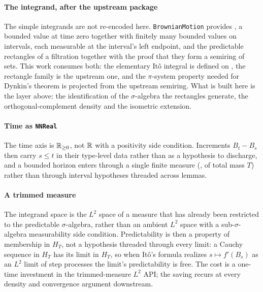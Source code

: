 \documentclass[11pt]{article}
\newcommand{\HT}{H_T}
\begin{document}
\paragraph{The integrand, after the upstream package}
The simple integrands are not re-encoded here. \texttt{BrownianMotion} provides , a
bounded value at time zero together with finitely many bounded values on intervals, each measurable at the
interval's left endpoint, and the predictable rectangles of a filtration together with the proof that they
form a semiring of sets. This work consumes both: the elementary It\^o integral is defined on
, the rectangle family is the upstream one, and the $\pi$-system property needed for
Dynkin's theorem is projected from the upstream semiring. What is built here is the layer above: the
identification of the $\sigma$-algebra the rectangles generate, the orthogonal-complement density and the
isometric extension.

\paragraph{Time as \texttt{NNReal}}
The time axis is $\mathbb{R}_{\ge0}$, not $\mathbb{R}$ with a positivity side condition. Increments $B_t-B_s$ then carry
$s\le t$ in their type-level data rather than as a hypothesis to discharge, and a bounded horizon
enters through a single finite measure (, of total mass $T$) rather than through
interval hypotheses threaded across lemmas.

\paragraph{A trimmed measure}
The integrand space is the $L^2$ space of a measure that has already been restricted to the predictable
$\sigma$-algebra, rather than an ambient $L^2$ space with a sub-$\sigma$-algebra measurability side
condition. Predictability is then a property of membership in $\HT$, not a hypothesis threaded through
every limit: a Cauchy sequence in $\HT$ has its limit in $\HT$, so when It\^o's formula realizes
$s\mapsto f'(B_s)$ as an $L^2$ limit of step processes the limit's predictability is free. The cost is a
one-time investment in the trimmed-measure $L^2$ API; the saving recurs at every density and convergence
argument downstream.
\end{document}
